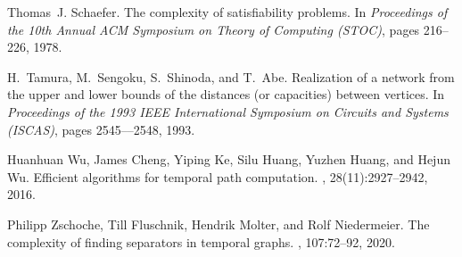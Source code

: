 \documentclass[a4paper,UKenglish,cleveref, autoref, thm-restate]{lipics-v2021}
\begin{document}
\begin{thebibliography}{10}
	Thomas~J. Schaefer.
	\newblock The complexity of satisfiability problems.
	\newblock In {\em Proceedings of the 10th Annual {ACM} Symposium on Theory of
		Computing (STOC)}, pages 216--226, 1978.
	
	H.~Tamura, M.~Sengoku, S.~Shinoda, and T.~Abe.
	\newblock Realization of a network from the upper and lower bounds of the
	distances (or capacities) between vertices.
	\newblock In {\em Proceedings of the 1993 IEEE International Symposium on
		Circuits and Systems (ISCAS)}, pages 2545–--2548, 1993.
	
	Huanhuan Wu, James Cheng, Yiping Ke, Silu Huang, Yuzhen Huang, and Hejun Wu.
	\newblock Efficient algorithms for temporal path computation.
	,
	28(11):2927--2942, 2016.
	
	Philipp Zschoche, Till Fluschnik, Hendrik Molter, and Rolf Niedermeier.
	\newblock The complexity of finding separators in temporal graphs.
	, 107:72--92, 2020.
	
\end{thebibliography}


\end{document}
